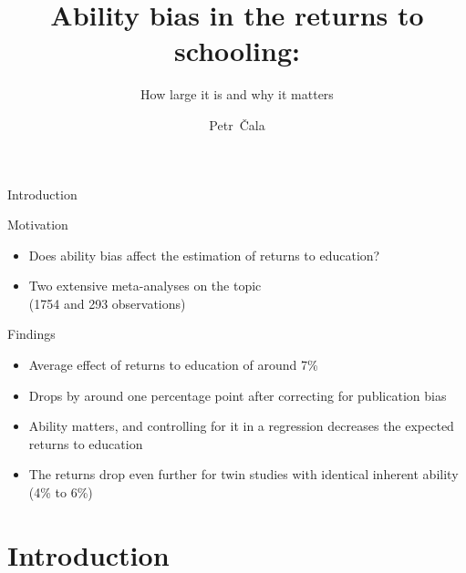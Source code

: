 \documentclass{beamer} %
\title[Ability bias and education] %
{Ability bias in the returns to schooling:}
\subtitle{How large it is and why it matters}
\author {Petr~\v{C}ala}
\institute[CUNI]
{
  Institute of Economic Studies\\
  Charles University, Prague\\
 
  \vspace{1.5em}

  \pgfdeclareimage[height=1.5cm]{logo}{Figures/logo.pdf} %
  \pgfuseimage{logo}

}
\date[June 19, 2024]
\begin{document}
\begin{frame}
    \titlepage
\end{frame}




\begin{frame}{Introduction}

    \begin{large}
        Motivation
    \end{large}

    \begin{itemize}
        \item<1-> Does ability bias affect the estimation of returns to education?
        \item<2-> Two extensive meta-analyses on the topic\\(1754 and 293 observations)
    \end{itemize}

    \begin{large}
        Findings
    \end{large}

    \begin{itemize}
        \item<3-> Average effect of returns to education of around 7\%
        \item<4-> Drops by around one percentage point after correcting for publication bias
        \item <5-> Ability matters, and controlling for it in a regression decreases the expected returns to education
        \item <6-> The returns drop even further for twin studies with identical inherent ability (4\% to 6\%)
    \end{itemize}

\end{frame}

\section{Introduction}
\subsection{}
\end{document}

